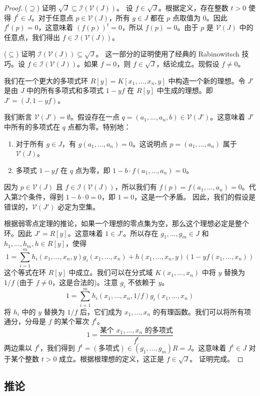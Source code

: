\documentclass[UTF8]{ctexart}
\newcommand{\V}{\mathcal{V}}
\newcommand{\I}{\mathcal{I}}
\begin{document}
\begin{proof}
($\supseteq$) 证明 $\sqrt{J} \subseteq \I(\V(J))$。
设 $f \in \sqrt{J}$。根据定义，存在整数 $t > 0$ 使得 $f^t \in J$。对于任意点 $p \in \V(J)$，所有 $g \in J$ 都在 $p$ 点取值为 $0$。因此 $f^t(p) = 0$，这意味着 $(f(p))^t = 0$，所以 $f(p)=0$。由于 $p$ 是 $\V(J)$ 中的任意点，我们得出 $f \in \I(\V(J))$。

($\subseteq$) 证明 $\I(\V(J)) \subseteq \sqrt{J}$。
这一部分的证明使用了经典的 Rabinowitsch 技巧。设 $f \in \I(\V(J))$。如果 $f=0$，则 $f \in \sqrt{J}$，结论成立。现假设 $f \neq 0$。

我们在一个更大的多项式环 $R[y] = K[x_1, \dots, x_n, y]$ 中构造一个新的理想。令 $J'$ 是由 $J$ 中的所有多项式和多项式 $1-yf$ 在 $R[y]$ 中生成的理想。即 $J' = (J, 1-yf)$。

我们断言 $\V(J') = \emptyset$。假设存在一点 $q = (a_1, \dots, a_n, b) \in \V(J')$。这意味着 $J'$ 中所有的多项式在 $q$ 点都为零。特别地：
\begin{enumerate}
    \item 对于所有 $g \in J$，有 $g(a_1, \dots, a_n) = 0$。这说明点 $p = (a_1, \dots, a_n)$ 属于 $\V(J)$。
    \item 多项式 $1-yf$ 在 $q$ 点为零，即 $1 - b \cdot f(a_1, \dots, a_n) = 0$。
\end{enumerate}
因为 $p \in \V(J)$ 且 $f \in \I(\V(J))$，所以我们有 $f(p) = f(a_1, \dots, a_n) = 0$。代入第2个条件，得到 $1 - b \cdot 0 = 0$，即 $1=0$，这是一个矛盾。
因此，我们的假设是错误的，$\V(J')$ 必定为空集。

根据弱零点定理的推论，如果一个理想的零点集为空，那么这个理想必定是整个环。因此 $J' = R[y]$。这意味着 $1 \in J'$。所以存在 $g_1, \dots, g_m \in J$ 和 $h_1, \dots, h_m, h \in R[y]$，使得
$$ 1 = \sum_{i=1}^m h_i(x_1, \dots, x_n, y) g_i(x_1, \dots, x_n) + h(x_1, \dots, x_n, y) (1 - yf(x_1, \dots, x_n)) $$
这个等式在环 $R[y]$ 中成立。我们可以在分式域 $K(x_1, \dots, x_n)$ 中将 $y$ 替换为 $1/f$ (由于 $f \neq 0$，这是合法的)。注意 $g_i$ 不依赖于 $y$。
$$ 1 = \sum_{i=1}^m h_i(x_1, \dots, x_n, 1/f) g_i(x_1, \dots, x_n) $$
将 $h_i$ 中的 $y$ 替换为 $1/f$ 后，它们成为 $x_1, \dots, x_n$ 的有理函数。我们可以将所有项通分，分母是 $f$ 的某个幂次 $f^t$。
$$ 1 = \frac{\text{某个 } x_1, \dots, x_n \text{ 的多项式}}{f^t} $$
两边乘以 $f^t$，我们得到 $f^t = (\text{多项式}) \in (g_1, \dots, g_m)R = J$。这意味着 $f^t \in J$ 对于某个整数 $t > 0$ 成立。根据根理想的定义，这正是 $f \in \sqrt{J}$。
证明完成。
\end{proof}

\subsection{推论}
\end{document}
